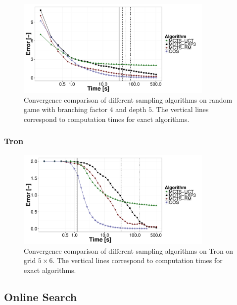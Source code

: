 \begin{figure}
\centering
\includegraphics[width=0.85\textwidth]{figures/convergence-rg-fix.pdf}
\caption{Convergence comparison of different sampling algorithms on random game with branching factor $4$ and depth $5$. The vertical lines correspond to computation times for exact algorithms.} \label{fig:off:conv:rg}
\end{figure}

\subsubsection{Tron}
\begin{figure}
\centering
\includegraphics[width=0.85\textwidth]{figures/convergence-tron.pdf}
\caption{Convergence comparison of different sampling algorithms on Tron on grid $5\times6$. The vertical lines correspond to computation times for exact algorithms.} \label{fig:off:conv:rg}
\end{figure}


\subsection{Online Search}

